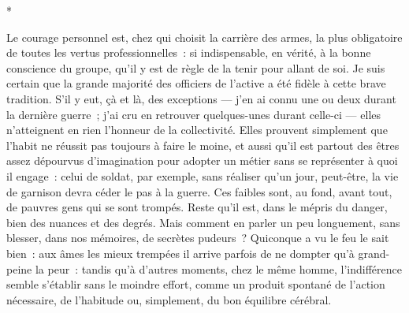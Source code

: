 \documentclass[french,twoside]{book} %
\begin{document}
\begin{center}
*\end{center}
\noindent Le courage personnel est, chez qui choisit la carrière des armes, la plus obligatoire de toutes les vertus professionnelles : si indispensable, en vérité, à la bonne conscience du groupe, qu’il y est de règle de la tenir pour allant de soi. Je suis certain que la grande majorité des officiers de l’active a été fidèle à cette brave tradition. S’il y eut, çà et là, des exceptions — j’en ai connu une ou deux durant la dernière guerre ; j’ai cru en retrouver quelques-unes durant celle-ci — elles n’atteignent en rien l’honneur de la collectivité. Elles prouvent simplement que l’habit ne réussit pas toujours à faire le moine, et aussi qu’il est partout des êtres assez dépourvus d’imagination pour adopter un métier sans se représenter à quoi il engage : celui de soldat, par exemple, sans réaliser qu’un jour, peut-être, la vie de garnison devra céder le pas à la guerre. Ces faibles sont, au fond, avant tout, de pauvres gens qui se sont trompés. Reste qu’il est, dans le mépris du danger, bien des nuances et des degrés. Mais comment en parler un peu longuement, sans blesser, dans nos mémoires, de secrètes pudeurs ? Quiconque a vu le feu le sait bien : aux âmes les mieux trempées il arrive parfois de ne dompter qu’à grand-peine la peur : tandis qu’à   d’autres moments, chez le même homme, l’indifférence semble s’établir sans le moindre effort, comme un produit spontané de l’action nécessaire, de l’habitude ou, simplement, du bon équilibre cérébral.\par
\end{document}
